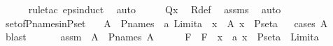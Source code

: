 \begin{isabellebody}
\ \ \ \ \isamarkupfalse%
\ {\isacharparenleft}{\kern0pt}rule{\isacharunderscore}{\kern0pt}tac\ eps{\isacharunderscore}{\kern0pt}induct{\isacharparenright}{\kern0pt}\ \isamarkupfalse%
\ auto\isanewline
\ \ \isamarkupfalse%
\ \isamarkupfalse%
\ {\isachardoublequoteopen}Q{\isacharparenleft}{\kern0pt}x{\isacharparenright}{\kern0pt}{\isachardoublequoteclose}\ \isamarkupfalse%
\ R{\isacharunderscore}{\kern0pt}def\ \isamarkupfalse%
\ assms\ \isamarkupfalse%
\ auto\ \isanewline
{}\isamarkupfalse%
%
\endisatagproof
{\isafoldproof}%
%
\isadelimproof
\isanewline
%
\endisadelimproof
\isanewline
{}\isamarkupfalse%
\ set{\isacharunderscore}{\kern0pt}of{\isacharunderscore}{\kern0pt}P{\isacharunderscore}{\kern0pt}names{\isacharunderscore}{\kern0pt}in{\isacharunderscore}{\kern0pt}P{\isacharunderscore}{\kern0pt}set\ {\isacharcolon}{\kern0pt}\isanewline
\ \ {\isachardoublequoteopen}A\ {\isasymsubseteq}\ P{\isacharunderscore}{\kern0pt}names\ {\isasymLongrightarrow}\ {\isacharparenleft}{\kern0pt}{\isasymexists}a{\isachardot}{\kern0pt}\ {\isacharparenleft}{\kern0pt}Limit{\isacharparenleft}{\kern0pt}a{\isacharparenright}{\kern0pt}\ {\isasymand}\ {\isacharparenleft}{\kern0pt}{\isasymforall}x\ {\isasymin}\ A{\isachardot}{\kern0pt}\ x\ {\isasymin}\ P{\isacharunderscore}{\kern0pt}set{\isacharparenleft}{\kern0pt}a{\isacharparenright}{\kern0pt}{\isacharparenright}{\kern0pt}{\isacharparenright}{\kern0pt}{\isacharparenright}{\kern0pt}{\isachardoublequoteclose}\isanewline
%
\isadelimproof
\ \ %
\endisadelimproof
%
\isatagproof
{}\isamarkupfalse%
{\isacharparenleft}{\kern0pt}cases\ {\isachardoublequoteopen}A{\isacharequal}{\kern0pt}{}{\isachardoublequoteclose}{\isacharparenright}{\kern0pt}\ \isamarkupfalse%
\ blast\isanewline
{}\isamarkupfalse%
\ {\isacharminus}{\kern0pt}\ \isanewline
\ \ \isamarkupfalse%
\ assm\ {\isacharcolon}{\kern0pt}\ {\isachardoublequoteopen}A\ {\isasymsubseteq}\ P{\isacharunderscore}{\kern0pt}names{\isachardoublequoteclose}\ {\isachardoublequoteopen}A\ {\isasymnoteq}\ {}{\isachardoublequoteclose}\isanewline
\ \ \isamarkupfalse%
\ F\ \ {\isachardoublequoteopen}F\ {\isasymequiv}\ {\isasymlambda}x{\isachardot}{\kern0pt}\ {\isacharparenleft}{\kern0pt}{\isasymmu}\ a{\isachardot}{\kern0pt}\ x\ {\isasymin}\ P{\isacharunderscore}{\kern0pt}set{\isacharparenleft}{\kern0pt}a{\isacharparenright}{\kern0pt}\ {\isasymand}\ Limit{\isacharparenleft}{\kern0pt}a{\isacharparenright}{\kern0pt}{\isacharparenright}{\kern0pt}{\isachardoublequoteclose}\ \isanewline

\end{isabellebody}
